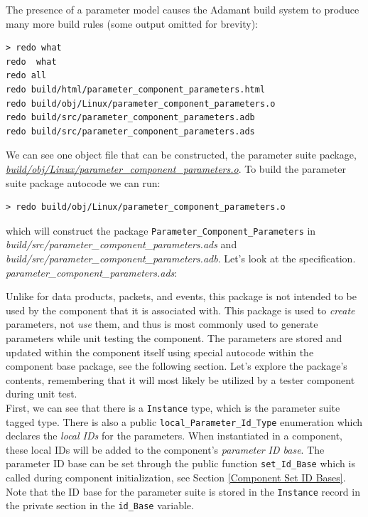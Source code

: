 The presence of a parameter model causes the Adamant build system to produce many more build rules (some output omitted for brevity):

\vspace{5mm} %
\begin{verbatim}
> redo what 
redo  what
redo all
redo build/html/parameter_component_parameters.html
redo build/obj/Linux/parameter_component_parameters.o
redo build/src/parameter_component_parameters.adb
redo build/src/parameter_component_parameters.ads
\end{verbatim}
\vspace{5mm} %

We can see one object file that can be constructed, the parameter suite package, \textit{\url{build/obj/Linux/parameter\_component\_parameters.o}}. To build the parameter suite package autocode we can run:

\vspace{5mm} %
\begin{verbatim}
> redo build/obj/Linux/parameter_component_parameters.o
\end{verbatim}
\vspace{5mm} %

which will construct the package \texttt{Parameter\_Component\_Parameters} in \textit{build/src/parameter\_component\_parameters.ads} and \textit{build/src/parameter\_component\_parameters.adb}. Let's look at the specification. \\

\textit{parameter\_component\_parameters.ads}:

Unlike for data products, packets, and events, this package is not intended to be used by the component that it is associated with. This package is used to \textit{create} parameters, not \textit{use} them, and thus is most commonly used to generate parameters while unit testing the component. The parameters are stored and updated within the component itself using special autocode within the component base package, see the following section. Let's explore the package's contents, remembering that it will most likely be utilized by a tester component during unit test. \\

First, we can see that there is a \texttt{Instance} type, which is the parameter suite tagged type. There is also a public \texttt{local\_Parameter\_Id\_Type} enumeration which declares the \textit{local IDs} for the parameters. When instantiated in a component, these local IDs will be added to the component's \textit{parameter ID base}. The parameter ID base can be set through the public function \texttt{set\_Id\_Base} which is called during component initialization, see Section \ref{Component Set ID Bases}. Note that the ID base for the parameter suite is stored in the \texttt{Instance} record in the private section in the \texttt{id\_Base} variable. \\

